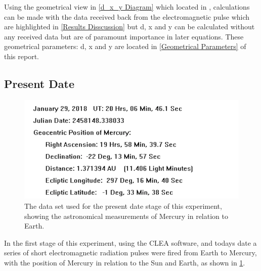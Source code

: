 \documentclass[11pt]{article}
\begin{document}
\begin{multicols}{2}
Using the geometrical view in \cref{d_x_y Diagram} which located in \cite{LLR.1-2018}, calculations can be made with the data received back from the electromagnetic pulse which are highlighted in \cref{Results Disscussion} but d, x and y can be calculated without any received data but are of paramount importance in later equations. These geometrical parameters: d, x and y are located in \cref{Geometrical Parameters} of this report.


\subsection{Present Date}\label{Present Date}

\begin{figure}[H]
\centering
\includegraphics[scale=0.6]{Present_Images.png/Data_Set.png}
\caption{The data set used for the present date stage of this experiment, showing the astronomical measurements of Mercury in relation to Earth.}
\label{1-Data Set}
\end{figure}

In the first stage of this experiment, using the CLEA software, and todays date a series of short electromagnetic radiation pulses were fired from Earth to Mercury, with the position of Mercury in relation to the Sun and Earth, as shown in \cref{1-Data Set}. \\


\end{multicols}
\end{document}
